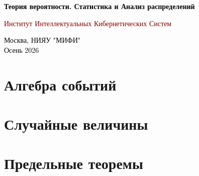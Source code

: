 \documentclass[a4paper,12pt]{article} %
\begin{document}
\newcommand\nbvspace[1][3]{\vspace*{\stretch{#1}}}
\newcommand\nbstretchyspace{\spaceskip0.5em plus 0.25em minus 0.25em}
\newcommand{\nbtitlestretch}{\spaceskip0.6em}
\pagestyle{empty}
\begin{center}
\bfseries
\nbvspace[1]
\Huge
{\fontsize{44}{60}\selectfont
\textcolor{black}{Теория вероятности. Статистика и Анализ распределений}}

\nbvspace[1]
\huge \textcolor{Maroon}{Институт Интеллектуальных Кибернетических Систем}\\[0.5em]

\nbvspace[2]


\nbvspace[3]
\normalsize

\textcolor{black}{Москва, НИЯУ "МИФИ"\space}\\
\large
\textcolor{black}{Осень 2026}
\nbvspace[1]
\end{center}




\newpage

\pagestyle{fancy}
\fancyhf{}
\fancyfoot[R]{\thepage} 
\setcounter{page}{2}
\headsep=10mm

\tableofcontents


\newpage

\newpage

\newpage

\section{Алгебра событий}






\section{Случайные величины}











\section{Предельные теоремы}





\end{document}
